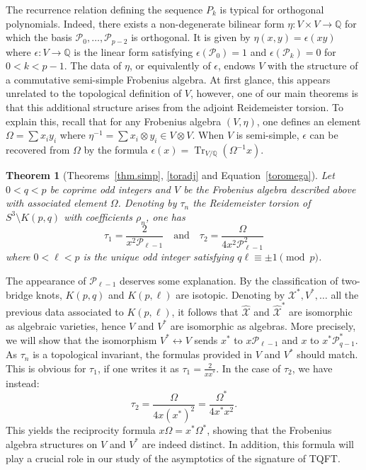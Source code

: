 \documentclass{amsart}
\newcommand{\Q}{\mathbb{Q}}
\newcommand{\calX}{\mathcal{X}}
\DeclareMathOperator{\Tr}{Tr}
\def\calP{\mathcal{P}}
\newtheorem{theoremA}{Theorem}
\theoremstyle{definition}
\begin{document}
The recurrence relation defining the sequence $P_k$ is typical for orthogonal polynomials. Indeed, there exists a non-degenerate bilinear form $\eta:V\times V\to \Q$ for which the basis $\calP_0,\ldots,\calP_{p-2}$ is orthogonal. It is given by $\eta(x,y)=\epsilon(xy)$ where $\epsilon:V\to \Q$ is the linear form satisfying $\epsilon(\calP_0)=1$ and $\epsilon(\calP_k)=0$ for $0<k<p-1$. 
The data of $\eta$, or equivalently of $\epsilon$, endows $V$ with the structure of a commutative semi-simple Frobenius algebra. 
At first glance, this appears unrelated to the topological definition of $V$, however, one of our main theorems is that this additional structure arises from the adjoint Reidemeister torsion.
To explain this, recall that for any Frobenius algebra $(V,\eta)$, one defines an element $\Omega=\sum x_iy_i$ where $\eta^{-1}=\sum x_i\otimes y_i\in V\otimes V$. When $V$ is semi-simple, $\epsilon$ can be recovered from $\Omega$ by the formula $\epsilon(x)=\Tr_{V/\Q}(\Omega^{-1}x)$. 


\begin{theoremA} [Theorems~\ref{thm.simp}, \ref{toradj} and Equation~\eqref{toromega}]
    Let $0<q<p$ be coprime odd integers and $V$ be the Frobenius algebra described above with associated element $\Omega$. Denoting by $\tau_n$ the Reidemeister torsion of $S^3\setminus K(p,q)$ with coefficients $\rho_n$, one has
    $$\tau_1=\frac{2}{x^2\calP_{\ell-1}}\quad \text{and} \quad \tau_2=\frac{\Omega}{4x^2\calP_{\ell-1}^2}$$
    where $0<\ell<p$ is the unique odd integer satisfying $q\ell \equiv \pm 1 \pmod{p}$.
\end{theoremA}

The appearance of $\calP_{\ell-1}$ deserves some explanation. By the classification of two-bridge knots, $K(p,q)$ and $K(p,\ell)$ are isotopic. Denoting by $\calX^*,V^*,\ldots$ all the previous data associated to $K(p,\ell)$, it follows that $\hat{\calX}$ and $\hat{\calX}^*$ are isomorphic as algebraic varieties, hence $V$ and $V^*$ are isomorphic as algebras. More precisely, we will show that the isomorphism $V^*\leftrightarrow V$ sends $x^*$ to $x\calP_{\ell-1}$ and $x$ to $x^*\calP^*_{q-1}$. 
As $\tau_n$ is a topological invariant, the formulas provided in $V$ and $V^*$ should match. This is obvious for $\tau_1$, if one writes it as $\tau_1=\frac{2}{xx^*}$. In the case of $\tau_2$, we have instead:
$$\tau_2=\frac{\Omega}{4x(x^*)^2}=\frac{\Omega^*}{4x^*x^2}.$$
This yields the reciprocity formula $x\Omega=x^*\Omega^*$, showing that the Frobenius algebra structures on $V$ and $V^*$ are indeed distinct. In addition, this formula will play a crucial role in our study of the asymptotics of the signature of TQFT.
\end{document}
